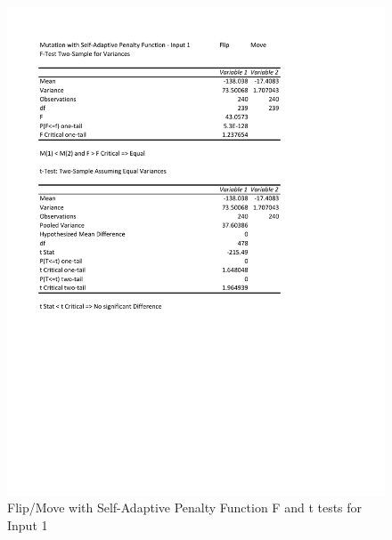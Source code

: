 \documentclass[times]{article}
\begin{document}
	\begin{figure}
		\caption{Flip/Move with Self-Adaptive Penalty Function F and t tests for Input 1}
		\label{fig:flip_move_sa_penalty1}
		\includegraphics[width=\textwidth]{./t_test/mutation_sa_penalty1}
	\end{figure}
\end{document}

